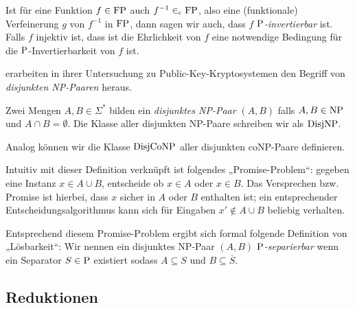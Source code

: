 Ist für eine Funktion $f\in\FP$ auch $f^{-1}\inc \FP$, also eine (funktionale) Verfeinerung $g$ von $f^{-1}$ in $\FP$, dann sagen wir auch, dass $f$ \emph{$\P$-invertierbar} ist. Falls $f$ injektiv ist, dass ist die Ehrlichkeit von $f$ eine notwendige Bedingung für die $\P$-Invertierbarkeit von $f$ ist.

\textcite{grollmann_complexity_1988} erarbeiten in ihrer Untersuchung zu Public-Key-Kryptosystemen den Begriff von \emph{disjunkten NP-Paaren} heraus.

\begin{definition}[$\DisjNP, \DisjCoNP$]
    Zwei Mengen $A,B\in\Sigma^*$ bilden ein \emph{disjunktes NP-Paar} $(A,B)$ falls $A,B\in\NP$ und $A\cap B = \emptyset$.
    Die Klasse aller disjunkten NP-Paare schreiben wir als $\DisjNP$.
    
    Analog können wir die Klasse $\DisjCoNP$ aller disjunkten coNP-Paare definieren.
\end{definition}
Intuitiv mit dieser Definition verknüpft ist folgendes „Promise-Problem“: gegeben eine Instanz $x\in A\cup B$, entscheide ob $x\in A$ oder $x\in B$. Das Versprechen bzw. Promise ist hierbei, dass $x$ sicher in $A$ oder $B$ enthalten ist; ein entsprechender Entscheidungsalgorithmus kann sich für Eingaben $x'\not\in A\cup B$ beliebig verhalten.

Entsprechend diesem Promise-Problem ergibt sich formal folgende Definition von „Lösbarkeit“:
Wir nennen ein disjunktes NP-Paar $(A,B)$ \emph{$\P$-separierbar} wenn ein Separator $S\in\P$ existiert sodass $A\subseteq S$ und $B\subseteq\overline{S}$.

\subsection*{Reduktionen}

